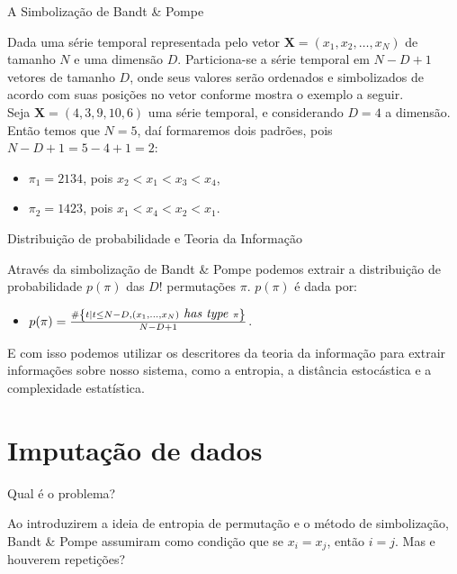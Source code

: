 \documentclass{beamer}
\begin{document}
\begin{frame}{A Simbolização de Bandt \& Pompe}

Dada uma série temporal representada pelo vetor $\bm {X} = (x_1, x_2, \dots, x_N)$ de tamanho $N$ e uma dimensão $D$. Particiona-se a série temporal em $N - D + 1$ vetores de tamanho $D$, onde seus valores serão ordenados e simbolizados de acordo com suas posições no vetor conforme mostra o exemplo a seguir.\\
\vspace{0.3cm}
Seja $\bm {X} = (4,3,9,10,6)$ uma série temporal, e considerando $D = 4$ a dimensão. Então temos que $N = 5$, daí formaremos dois padrões, pois $N - D + 1 = 5 - 4 + 1 = 2$:\\
\begin{itemize}
    \item$\pi_1 = 2134$, pois $x_2 < x_1 < x_3 < x_4$,
    \item$\pi_2 = 1423$, pois $x_1 < x_4 < x_2 < x_1$.
\end{itemize}
 
\end{frame}

\begin{frame}{Distribuição de probabilidade e Teoria da Informação}

Através da simbolização de Bandt \& Pompe podemos extrair a distribuição de probabilidade $p(\pi)$ das $D!$ permutações $\pi$. $p(\pi)$ é dada por:


\begin{itemize}
    \item $p(\pi) = \frac{\# \left\{t| t \leq N - D, (x_1,\dots,x_N)  \hbox{\textit{ has type }} \pi\right\}}{N - D + 1}$.\\
\end{itemize}


E com isso podemos utilizar os descritores da teoria da informação para extrair informações sobre nosso sistema, como a entropia, a distância estocástica e a complexidade estatística.

\end{frame}

\section{Imputação de dados}

\begin{frame}{Qual é o problema?}

Ao introduzirem a ideia de entropia de permutação e o método de simbolização, Bandt \& Pompe assumiram como condição que se $x_i = x_j$, então $i = j$. Mas e houverem repetições?

\end{frame}
\end{document}
